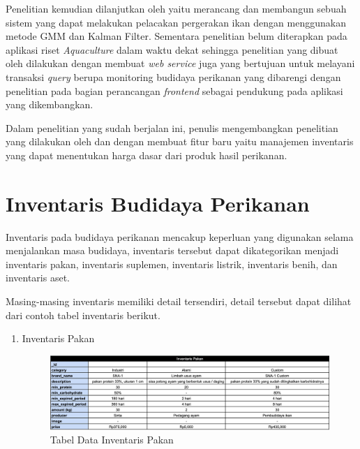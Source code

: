 \begin{spacing}{1.5}
Penelitian \citep{bagus2022} kemudian dilanjutkan oleh \citep{hafiz2021} yaitu merancang dan membangun sebuah sistem yang dapat melakukan pelacakan pergerakan ikan dengan menggunakan metode GMM dan Kalman Filter. Sementara penelitian \citep{fadhil2021} belum diterapkan pada aplikasi riset \textit{Aquaculture} dalam waktu dekat sehingga penelitian yang dibuat oleh \citep{andri2022} dilakukan dengan membuat \textit{web service} juga yang bertujuan untuk melayani transaksi \textit{query} berupa monitoring budidaya perikanan yang dibarengi dengan penelitian \citep{gian2022} pada bagian perancangan \textit{frontend} sebagai pendukung pada aplikasi yang dikembangkan.

Dalam penelitian yang sudah berjalan ini, penulis mengembangkan penelitian yang dilakukan oleh \citep{andri2022} dan \citep{gian2022} dengan membuat fitur baru yaitu manajemen inventaris yang dapat menentukan harga dasar dari produk hasil perikanan.

\section{Inventaris Budidaya Perikanan}

Inventaris pada budidaya perikanan mencakup keperluan yang digunakan selama menjalankan masa budidaya, inventaris tersebut dapat dikategorikan menjadi inventaris pakan, inventaris suplemen, inventaris listrik, inventaris benih, dan inventaris aset.

Masing-masing inventaris memiliki detail tersendiri, detail tersebut dapat dilihat dari contoh tabel inventaris berikut.

\hfill \break
\hfill \break
\hfill \break
\hfill \break
\hfill \break

\begin{enumerate}
	\item Inventaris Pakan
	
	\begin{figure}[H]
		\centering
		\includegraphics[width=1\textwidth]{gambar/tabel_inventaris_pakan.png}
		\caption{Tabel Data Inventaris Pakan}
	\end{figure}	


\end{enumerate}
\end{spacing}
